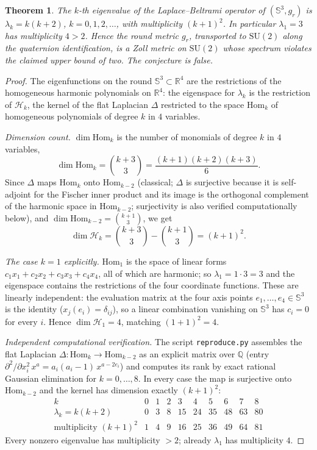 \documentclass[11pt]{article}
\newtheorem{theorem}{Theorem}
\newcommand{\SSp}{\mathbb{S}}
\newcommand{\R}{\mathbb{R}}
\begin{document}
\begin{theorem}\label{thm:main}
The $k$-th eigenvalue of the Laplace--Beltrami operator of $(\SSp^3, g_r)$ is
$\lambda_k = k(k+2)$, $k = 0, 1, 2, \dots$, with multiplicity $(k+1)^2$. In
particular $\lambda_1 = 3$ has multiplicity $4 > 2$. Hence the round metric
$g_r$, transported to $\mathrm{SU}(2)$ along the quaternion identification,
is a Zoll metric on $\mathrm{SU}(2)$ whose spectrum violates the claimed
upper bound of two. The conjecture is false.
\end{theorem}

\begin{proof}
The eigenfunctions on the round $\SSp^3 \subset \R^4$ are the restrictions of
the homogeneous harmonic polynomials on $\R^4$: the eigenspace for
$\lambda_k$ is the restriction of $\mathcal{H}_k$, the kernel of the flat
Laplacian $\Delta$ restricted to the space $\mathrm{Hom}_k$ of homogeneous
polynomials of degree $k$ in $4$ variables.

\emph{Dimension count.} $\dim \mathrm{Hom}_k$ is the number of monomials of
degree $k$ in $4$ variables,
\[
\dim \mathrm{Hom}_k = \binom{k+3}{3} = \frac{(k+1)(k+2)(k+3)}{6}.
\]
Since $\Delta$ maps $\mathrm{Hom}_k$ onto $\mathrm{Hom}_{k-2}$ (classical;
$\Delta$ is surjective because it is self-adjoint for the Fischer inner
product and its image is the orthogonal complement of the harmonic space in
$\mathrm{Hom}_{k-2}$; surjectivity is also verified computationally below),
and $\dim \mathrm{Hom}_{k-2} = \binom{k+1}{3}$, we get
\[
\dim \mathcal{H}_k = \binom{k+3}{3} - \binom{k+1}{3} = (k+1)^2 .
\]

\emph{The case $k=1$ explicitly.} $\mathrm{Hom}_1$ is the space of linear
forms $c_1 x_1 + c_2 x_2 + c_3 x_3 + c_4 x_4$, all of which are harmonic;
so $\lambda_1 = 1 \cdot 3 = 3$ and the eigenspace contains the restrictions
of the four coordinate functions. These are linearly independent: the
evaluation matrix at the four axis points $e_1, \dots, e_4 \in \SSp^3$ is the
identity ($x_j(e_i) = \delta_{ij}$), so a linear combination vanishing on
$\SSp^3$ has $c_i = 0$ for every $i$. Hence
$\dim \mathcal{H}_1 = 4$, matching $(1+1)^2 = 4$.

\emph{Independent computational verification.} The script
\texttt{reproduce.py} assembles the flat Laplacian
$\Delta\colon \mathrm{Hom}_k \to \mathrm{Hom}_{k-2}$ as an explicit matrix
over $\mathbb{Q}$ (entry
$\partial^2/\partial x_i^2\, x^a = a_i(a_i - 1)\, x^{a - 2e_i}$) and computes
its rank by exact rational Gaussian elimination for $k = 0, \dots, 8$. In
every case the map is surjective onto $\mathrm{Hom}_{k-2}$ and the kernel has
dimension exactly $(k+1)^2$:
\[
\begin{array}{c|ccccccccc}
k & 0 & 1 & 2 & 3 & 4 & 5 & 6 & 7 & 8\\ \hline
\lambda_k = k(k+2) & 0 & 3 & 8 & 15 & 24 & 35 & 48 & 63 & 80\\
\text{multiplicity } (k+1)^2 & 1 & 4 & 9 & 16 & 25 & 36 & 49 & 64 & 81
\end{array}
\]
Every nonzero eigenvalue has multiplicity $> 2$; already $\lambda_1$ has
multiplicity $4$.
\end{proof}
\end{document}
